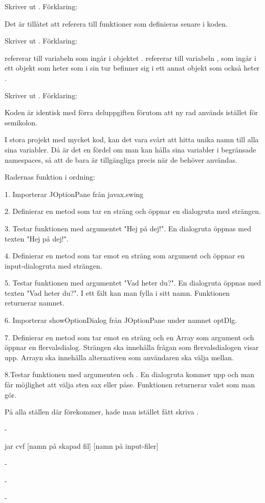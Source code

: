 \Subtask Skriver ut . Förklaring:

Det är tillåtet att referera till funktioner som definieras senare i koden.

\Subtask Skriver ut . Förklaring:

 refererar till variabeln  som ingår i objektet .
 refererar till variabeln , som ingår i ett objekt som heter  som i sin tur befinner sig i ett annat objekt som också heter .

\Subtask Skriver ut . Förklaring:

Koden är identisk med förra deluppgiften förutom att ny rad används istället för semikolon.

\Subtask I stora projekt med mycket kod, kan det vara svårt att hitta unika namn till alla sina variabler. Då är det en fördel om man kan hålla sina variabler i begränsade namespaces, så att de bara är tillgängliga precis när de behöver användas. 

\Task 
\Subtask {}
\Subtask Radernas funktion i ordning:

1. Importerar JOptionPane från javax.swing

2. Definierar en metod som tar en sträng och öppnar en dialogruta med strängen.

3. Testar funktionen med argumentet "Hej på dej!". En dialogruta öppnas med texten "Hej på dej!".

4. Definierar en metod som tar emot en sträng som argument och öppnar en input-dialogruta med strängen.

5. Testar funktionen med argumentet "Vad heter du?". En dialogruta öppnas med texten "Vad heter du?". I ett fält kan man fylla i sitt namn. Funktionen returnerar namnet.

6. Importerar showOptionDialog från JOptionPane under namnet optDlg.

7. Definierar en metod som tar emot en sträng och en Array som argument och öppnar en flervalsdialog. Strängen ska innehålla frågan som flervalsdialogen visar upp. Arrayn ska innehålla alternativen som användaren ska välja mellan.

8.Testar funktionen med argumenten  och . En dialogruta kommer upp och man får möjlighet att välja sten sax eller påse. Funktionen returnerar valet som man gör.

\Subtask På alla ställen där  förekommer, hade man istället fått skriva .

\Subtask -

\Task 
\Subtask jar cvf [namn på skapad fil] [namn på input-filer]

\Subtask -

\Task 
\Subtask -

\Subtask -
